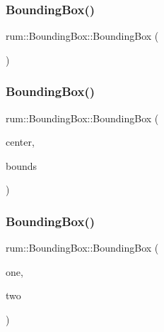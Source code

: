 \subsubsection{\texorpdfstring{Bounding\+Box()}{BoundingBox()}\hspace{0.1cm}{\footnotesize\ttfamily [1/3]}}
{\footnotesize\ttfamily rum\+::\+Bounding\+Box\+::\+Bounding\+Box (\begin{DoxyParamCaption}{ }\end{DoxyParamCaption})}

\mbox{\label{classrum_1_1_bounding_box_a60123b8bafc7fa4ef78cdf2a4c49eac3}} 
\subsubsection{\texorpdfstring{Bounding\+Box()}{BoundingBox()}\hspace{0.1cm}{\footnotesize\ttfamily [2/3]}}
{\footnotesize\ttfamily rum\+::\+Bounding\+Box\+::\+Bounding\+Box (\begin{DoxyParamCaption}\item[{const glm\+::vec3 \&}]{center,  }\item[{const glm\+::vec3 \&}]{bounds }\end{DoxyParamCaption})}

\mbox{\label{classrum_1_1_bounding_box_a68f722c0cc72e5c939fa1fa382b26330}} 
\subsubsection{\texorpdfstring{Bounding\+Box()}{BoundingBox()}\hspace{0.1cm}{\footnotesize\ttfamily [3/3]}}
{\footnotesize\ttfamily rum\+::\+Bounding\+Box\+::\+Bounding\+Box (\begin{DoxyParamCaption}\item[{const \hyperlink{classrum_1_1_bounding_box}{Bounding\+Box} \&}]{one,  }\item[{const \hyperlink{classrum_1_1_bounding_box}{Bounding\+Box} \&}]{two }\end{DoxyParamCaption})}

